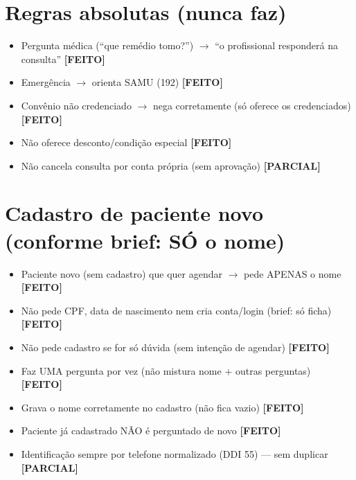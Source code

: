 \documentclass[11pt,a4paper]{article}
\newcommand{\sok}{\textcolor{verde}{\textbf{[FEITO]}}}
\newcommand{\sparc}{\textcolor{ambar}{\textbf{[PARCIAL]}}}
\begin{document}
\section{Regras absolutas (nunca faz)}
\begin{itemize}
  \item Pergunta m\'edica (``que rem\'edio tomo?'') $\rightarrow$ ``o profissional responder\'a na consulta'' \sok
  \item Emerg\^encia $\rightarrow$ orienta SAMU (192) \sok
  \item Conv\^enio n\~ao credenciado $\rightarrow$ nega corretamente (s\'o oferece os credenciados) \sok
  \item N\~ao oferece desconto/condi\c{c}\~ao especial \sok
  \item N\~ao cancela consulta por conta pr\'opria (sem aprova\c{c}\~ao) \sparc
\end{itemize}

\section{Cadastro de paciente novo (conforme brief: S\'O o nome)}
\begin{itemize}
  \item Paciente novo (sem cadastro) que quer agendar $\rightarrow$ pede APENAS o nome \sok
  \item N\~ao pede CPF, data de nascimento nem cria conta/login (brief: s\'o ficha) \sok
  \item N\~ao pede cadastro se for s\'o d\'uvida (sem inten\c{c}\~ao de agendar) \sok
  \item Faz UMA pergunta por vez (n\~ao mistura nome + outras perguntas) \sok
  \item Grava o nome corretamente no cadastro (n\~ao fica vazio) \sok
  \item Paciente j\'a cadastrado N\~AO \'e perguntado de novo \sok
  \item Identifica\c{c}\~ao sempre por telefone normalizado (DDI 55) --- sem duplicar \sparc
\end{itemize}

\end{document}
